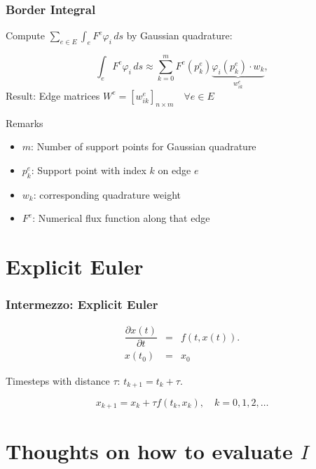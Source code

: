\documentclass{beamer}
\newcommand{\pd}[2]{\dfrac{\partial #1}{\partial #2}}
\renewcommand{\phi}{\varphi}
\begin{document}
\begin{frame}
  \frametitle{Border Integral}
  Compute $\sum_{e \in E} \int_{e} F^e \phi_i \, ds$ by Gaussian quadrature:

  \begin{equation}
    \int_{e} F^e \phi_i \, ds \approx \sum_{k=0}^{m} F^e(p_k^e) \underbrace{\phi_i(p_k^e) \cdot w_k}_{w_{ik}^e},
  \end{equation}
  Result: Edge matrices $W^e = [w_{ik}^e]_{n \times m} \quad \forall e \in E$
  \begin{block}{Remarks}
    \begin{itemize}
    \item $m$: Number of support points for Gaussian quadrature
    \item $p_k^e$: Support point with index $k$ on edge $e$
    \item $w_k$: corresponding quadrature weight
    \item $F^e$: Numerical flux function along that edge
    \end{itemize}
  \end{block}
\end{frame}

\section{Explicit Euler}
\label{sec:appendix-explicit-euler}

\begin{frame}
  \frametitle{Intermezzo: Explicit Euler}
  \begin{eqnarray}
    \label{eq:euler-method-setting}
    \pd{x(t)}{t} &=& f(t, x(t)). \\
    x(t_0) &=& x_0
  \end{eqnarray}

  Timesteps with distance $\tau$: $t_{k+1} = t_k + \tau$.

  \begin{equation}
    \label{eq:euler-step-solution}
    x_{k+1} = x_k + \tau f(t_k, x_k), \quad k=0,1,2,\dots
  \end{equation}

\end{frame}


\section{Thoughts on how to evaluate $I$}
\label{sec:appendix-evaluate-I}
\end{document}
